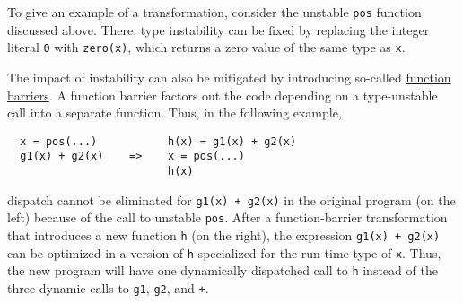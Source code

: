 \documentclass[twocolumn]{article}
\begin{document}
To give an example of a transformation, consider the unstable
\texttt{pos} function discussed above. There, type instability can be
fixed by replacing the integer literal \texttt{0} with \texttt{zero(x)},
which returns a zero value of the same type as \texttt{x}.

The impact of instability can also be mitigated by introducing so-called
\href{https://docs.julialang.org/en/v1/manual/performance-tips/#kernel-functions}{function barriers}.
A function barrier factors out the code
depending on a type-unstable call into a separate function. Thus, in the
following example,
\begin{verbatim}
  x = pos(...)           h(x) = g1(x) + g2(x)
  g1(x) + g2(x)    =>    x = pos(...)
                         h(x)
\end{verbatim}
dispatch cannot be eliminated for \texttt{g1(x)\ +\ g2(x)} in the
original program (on the left)
because of the call to unstable \texttt{pos}. After a
function-barrier transformation that introduces a new function
\texttt{h} (on the right), the expression \texttt{g1(x)~+~g2(x)} can be optimized in
a version of \texttt{h} specialized for the run-time type of \texttt{x}.
Thus, the new program will have one dynamically dispatched call to
\texttt{h} instead of the three dynamic calls to \texttt{g1},
\texttt{g2}, and \texttt{+}.


\vspace*{-2.7em}


\end{document}

